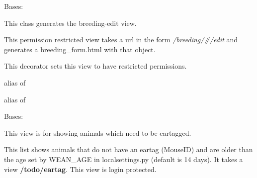 \documentclass[letterpaper,10pt,english]{sphinxmanual}
\begin{document}
\begin{fulllineitems}
\label{api:mousedb.animal.views.BreedingUpdate}
Bases: \href{http://docs.djangoproject.com/en/dev/ref/class-based-views/\#django.views.generic.edit.UpdateView}{}

This class generates the breeding-edit view.

This permission restricted view takes a url in the form \emph{/breeding/\#/edit} and generates a breeding\_form.html with that object.


\begin{fulllineitems}
\label{api:mousedb.animal.views.BreedingUpdate.dispatch}
This decorator sets this view to have restricted permissions.

\end{fulllineitems}



\begin{fulllineitems}
\label{api:mousedb.animal.views.BreedingUpdate.form_class}
alias of 

\end{fulllineitems}



\begin{fulllineitems}
\label{api:mousedb.animal.views.BreedingUpdate.model}
alias of 

\end{fulllineitems}


\end{fulllineitems}



\begin{fulllineitems}
\label{api:mousedb.animal.views.EarTagList}
Bases: {\hyperref[api:mousedb.animal.views.AnimalList]{}}

This view is for showing animals which need to be eartagged.

This list shows animals that do not have an eartag (MouseID) and are older than the age set by WEAN\_AGE in localsettings.py (default is 14 days).
It takes a view \textbf{/todo/eartag}.
This view is login protected.

\end{fulllineitems}
\end{document}
